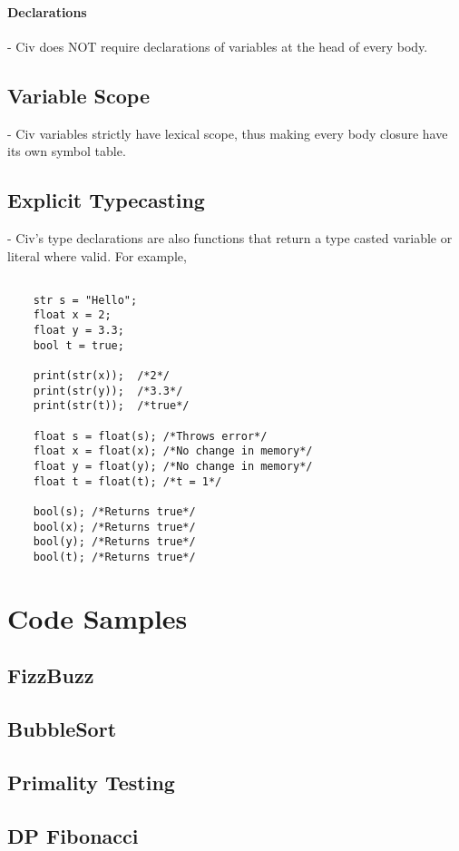 \documentclass[a4paper]{article}
\begin{document}
\paragraph{Declarations} - Civ does NOT require declarations of variables at the head of every body.

\subsection{Variable Scope} - Civ variables strictly have lexical scope, thus making every body closure have its own symbol table.

\subsection{Explicit Typecasting} - Civ's type declarations are also functions that return a type casted variable or literal where valid. For example,

{\selectfont
\begin{lstlisting}

	str s = "Hello";
	float x = 2;
	float y = 3.3;
	bool t = true;

	print(str(x));  /*2*/
	print(str(y));  /*3.3*/
	print(str(t));  /*true*/

	float s = float(s); /*Throws error*/
	float x = float(x); /*No change in memory*/
	float y = float(y); /*No change in memory*/
	float t = float(t); /*t = 1*/
	
	bool(s); /*Returns true*/
	bool(x); /*Returns true*/
	bool(y); /*Returns true*/
	bool(t); /*Returns true*/
\end{lstlisting}
}

\section{Code Samples}
\subsection{FizzBuzz}
\subsection{BubbleSort}
\subsection{Primality Testing}
\subsection{DP Fibonacci}
\end{document}
